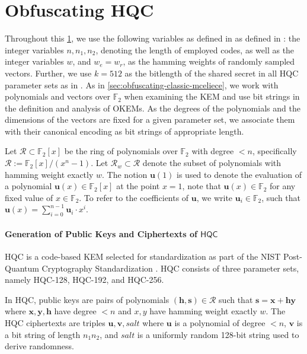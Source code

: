 \section{Obfuscating HQC} \label{sec:obfuscating-hqc}

Throughout this \cref{sec:obfuscating-hqc}, we use the following variables as defined in as defined in \cite{NISTPQC-R4:HQC22}: the integer variables $n, n_1, n_2$, denoting the length of employed codes, as well as the integer variables $w$, and $w_e = w_r$, as the hamming weights of randomly sampled vectors. Further, we use $k = 512$ as the bitlength of the shared secret in all HQC parameter sets as in \cite[Figure~3, Table~7]{NISTPQC-R4:HQC22}.
As in \cref{sec:obfuscating-classic-mceliece}, we work with polynomials and vectors over $\mathbb F_2$ when examining the KEM and use bit strings in the definition and analysis of OKEMs. As the degrees of the polynomials and the dimensions of the vectors are fixed for a given parameter set, we associate them with their canonical encoding as bit strings of appropriate length.

Let $\mathcal R \subset \mathbb{F}_2[x]$ be the ring of polynomials over $\mathbb F_2$ with degree $<n$, specifically $\mathcal R := \mathbb{F}_2[x]/(x^n-1)$. Let $\mathcal R_w \subset \mathcal R$ denote the subset of polynomials with hamming weight exactly $w$. The notion $\mathbf u(1)$ is used to denote the evaluation of a polynomial $\mathbf u(x) \in \mathbb{F}_2[x]$ at the point $x=1$, note that $\mathbf u(x) \in \mathbb{F}_2$ for any fixed value of $x \in \mathbb{F}_2$. To refer to the coefficients of $\mathbf u$, we write $\mathbf u_i \in \mathbb{F}_2$, such that $\mathbf u(x) = \sum_{i=0}^{n-1} \mathbf u_i \cdot x^i$.

\paragraph{Generation of Public Keys and Ciphertexts of $\mathsf{HQC}$}

HQC is a code-based KEM selected for standardization as part of the NIST Post-Quantum Cryptography Standardization \cite{nist-standardization,nist-ir-8545}. HQC consists of three parameter sets, namely HQC-128, HQC-192, and HQC-256.

In HQC, public keys are pairs of polynomials $(\mathbf h, \mathbf s) \in \mathcal R$ such that $\mathbf s = \mathbf x + \mathbf h \mathbf y$ where $\mathbf x,\mathbf y,\mathbf h$ have degree $<n$ and $x,y$ have hamming weight exactly $w$.
The HQC ciphertexts are triples $\mathbf u,\mathbf v,\mathit{salt}$ where $\mathbf u$ is a polynomial of degree $<n$, $\mathbf v$ is a bit string of length $n_1n_2$, and $\mathit{salt}$ is a uniformly random 128-bit string used to derive randomness.

